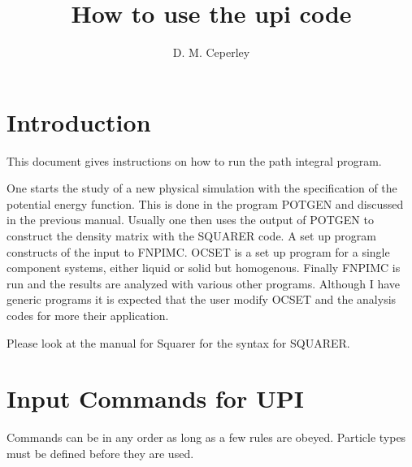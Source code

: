 \newcommand{\be}{\begin{equation}}
\newcommand{\ee}{\end{equation}}
\newcommand{\bv}{\begin{verbatim}}
\newcommand{\ev}{\end{verbatim}}

\title{How to use the upi code}
\author{D. M. Ceperley}
\maketitle
\section{Introduction}
This document gives instructions on how to run the path integral
program.

One starts the study of a new physical simulation with the 
specification of the potential energy function. This is done
in the program POTGEN and discussed in the previous manual. 
Usually one then uses the output of
POTGEN to construct the density matrix with the SQUARER code.  
A set up program constructs of the
input to FNPIMC.  OCSET is a set up program for a single component
systems, either liquid or solid but homogenous.
Finally FNPIMC is run and the results are
analyzed with various other programs. Although I have
generic 
programs it is expected that the user modify OCSET and
the analysis codes for more their application.

Please look at the manual for Squarer for the syntax for SQUARER.

\section{Input Commands for UPI}
Commands can be in any order as long as a few rules are obeyed.
Particle types must be defined before they are used.

